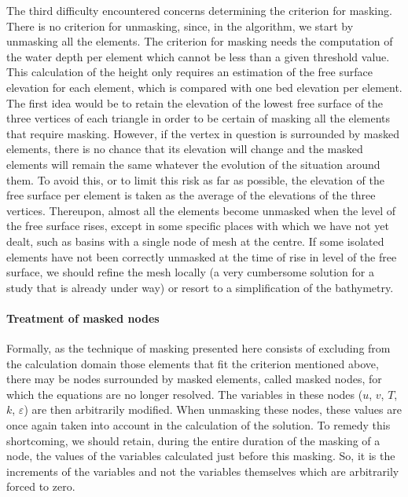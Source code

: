 The third difficulty encountered concerns determining the criterion for
masking. There is no criterion for unmasking, since, in the algorithm, we
start by unmasking all the elements. The criterion for masking needs the
computation of the water depth per element which cannot be less than a given
threshold value. This calculation of the height only requires an estimation of
the free surface elevation for each element, which is compared with one bed
elevation per element. The first idea would be to retain the elevation of the
lowest free surface of the three vertices of each triangle in order to be
certain of masking all the elements that require masking. However, if the
vertex in question is surrounded by masked elements, there is no chance that
its elevation will change and the masked elements will remain the same
whatever the evolution of the situation around them. To avoid this, or to
limit this risk as far as possible, the elevation of the free surface per
element is taken as the average of the elevations of the three vertices.
Thereupon, almost all the elements become unmasked when the level of the free
surface rises, except in some specific places with which we have not yet
dealt, such as basins with a single node of mesh at the centre. If some
isolated elements have not been correctly unmasked at the time of rise in
level of the free surface, we should refine the mesh locally (a very
cumbersome solution for a study that is already under way) or resort to a
simplification of the bathymetry.

\paragraph{Treatment of masked nodes}

Formally, as the technique of masking presented here consists of excluding
from the calculation domain those elements that fit the criterion mentioned
above, there may be nodes surrounded by masked elements, called masked nodes,
for which the equations are no longer resolved. The variables in these nodes
($u$, $v$, $T$, $k$, $\varepsilon$) are then arbitrarily modified. When
unmasking these nodes, these values are once again taken into account in the
calculation of the solution. To remedy this shortcoming, we should retain,
during the entire duration of the masking of a node, the values of the
variables calculated just before this masking. So, it is the increments of the
variables and not the variables themselves which are arbitrarily forced to zero.

